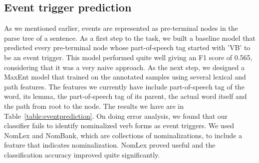 \subsection{Event trigger prediction}
As we mentioned earlier, events are represented as pre-terminal nodes in the parse tree of a sentence. As a first step to the task, we built a baseline model that predicted every pre-terminal node whose part-of-speech tag started with 'VB' to be an event trigger. This model performed quite well giving an F1 score of 0.565, considering that it was a very naive approach. As the next step, we designed a MaxEnt model that trained on the annotated samples using several lexical and path features. The features we currently have include part-of-speech tag of the word, its lemma, the part-of-speech tag of its parent, the actual word itself and the path from root to the node. The results we have are in Table~\ref{table:eventprediction}. On doing error analysis, we found that our classifier fails to identify nominalized verb forms as event triggers. We used NomLex and NomBank, which are collections of nominalizations, to include a feature that indicates nominalization. NomLex proved useful and the classification accuracy improved quite significantly.

